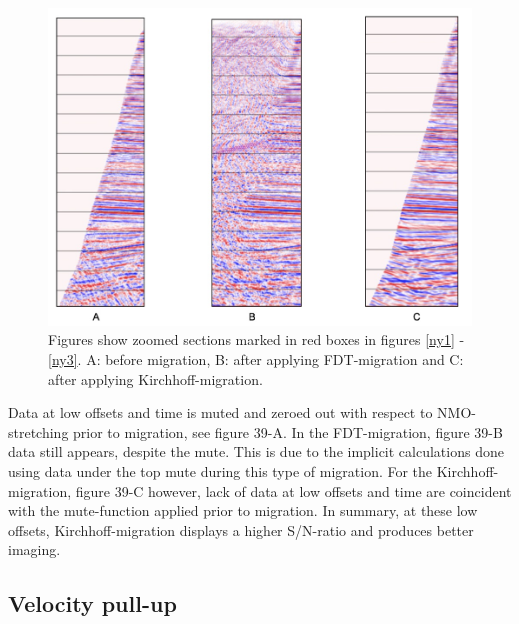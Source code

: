 \documentclass[10pt,a4paper]{article}
\begin{document}
\begin{figure}[H]
\includegraphics[width=\textwidth]{ny4.jpg}
\caption{Figures show zoomed sections marked in red boxes in figures \ref{ny1} - \ref{ny3}. A: before migration, B: after applying FDT-migration and C: after applying Kirchhoff-migration.}
\label{ny4}
\end{figure}

\noindent Data at low offsets and time is muted and zeroed out with respect to NMO-stretching prior to migration, see figure 39-A. In the FDT-migration, figure 39-B data still appears, despite the mute. This is due to the implicit calculations done using data under the top mute during this type of migration. For the Kirchhoff-migration, figure 39-C however, lack of data at low offsets and time are coincident with the mute-function applied prior to migration. In summary, at these low offsets, Kirchhoff-migration displays a higher S/N-ratio and produces better imaging. 

\subsection{Velocity pull-up}
\end{document}
